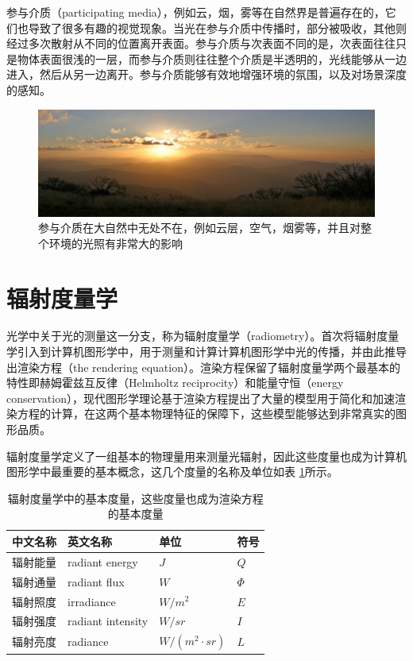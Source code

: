 参与介质（participating media），例如云，烟，雾等在自然界是普遍存在的，它们也导致了很多有趣的视觉现象。当光在参与介质中传播时，部分被吸收，其他则经过多次散射从不同的位置离开表面。参与介质与次表面不同的是，次表面往往只是物体表面很浅的一层，而参与介质则往往整个介质是半透明的，光线能够从一边进入，然后从另一边离开。参与介质能够有效地增强环境的氛围，以及对场景深度的感知。

\begin{figure}
	\includegraphics[width=1.0\textwidth]{figures/intro/Participating-media}
	\caption{参与介质在大自然中无处不在，例如云层，空气，烟雾等，并且对整个环境的光照有非常大的影响}
	\label{f:intro-Participating-media}
\end{figure}




\section{辐射度量学}
光学中关于光的测量这一分支，称为辐射度量学（radiometry）。\cite{a:TheRenderingEquation}首次将辐射度量学引入到计算机图形学中，用于测量和计算计算机图形学中光的传播，并由此推导出渲染方程（the rendering equation）。渲染方程保留了辐射度量学两个最基本的特性即赫姆霍兹互反律（Helmholtz reciprocity）和能量守恒（energy conservation），现代图形学理论基于渲染方程提出了大量的模型用于简化和加速渲染方程的计算，在这两个基本物理特征的保障下，这些模型能够达到非常真实的图形品质。

辐射度量学定义了一组基本的物理量用来测量光辐射，因此这些度量也成为计算机图形学中最重要的基本概念，这几个度量的名称及单位如表 \ref{t:radiometric-quantities}所示。

\begin{table}
\caption{辐射度量学中的基本度量，这些度量也成为渲染方程的基本度量}
\label{t:radiometric-quantities}

\begin{tabular}{p{}|p{}|p{}|p{}}
\hline
   中文名称&英文名称&单位&符号  \\
  \hline
  辐射能量&radiant energy & $J$& $Q$\\
  辐射通量&radiant flux & $W$  & $\Phi$\\
  辐射照度&irradiance & $W/m^2$ & $E$\\
  辐射强度&radiant intensity & $W/sr$ & $I$\\
  辐射亮度&radiance & $W/(m^2\cdot sr)$& $L$\\
\hline
\end{tabular}
\end{table}

